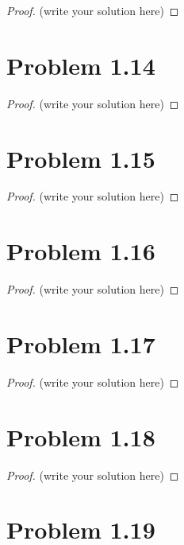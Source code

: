 \documentclass[12pt]{article}
\begin{document}
\begin{proof}
	(write your solution here)
\end{proof}

\newpage 

\section{Problem 1.14}

\begin{proof}
	(write your solution here)
\end{proof}

\newpage 

\section{Problem 1.15}

\begin{proof}
	(write your solution here)
\end{proof}

\newpage 

\section{Problem 1.16}

\begin{proof}
	(write your solution here)
\end{proof}

\newpage 

\section{Problem 1.17}

\begin{proof}
	(write your solution here)
\end{proof}

\newpage

\section{Problem 1.18}

\begin{proof}
	(write your solution here)
\end{proof}

\newpage 

\section{Problem 1.19}
\end{document}
